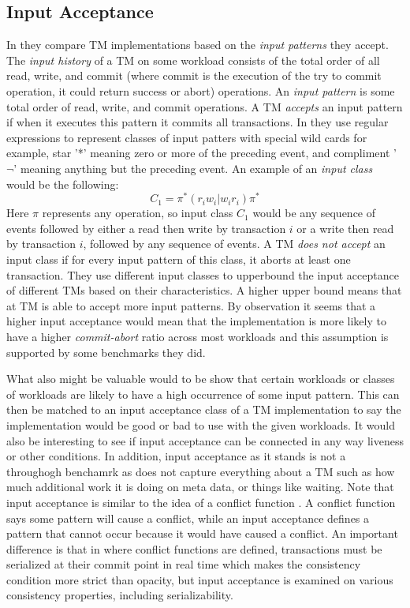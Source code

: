 \subsection{Input Acceptance}
In \cite{LPD-ARTICLE-2009-004} they compare TM implementations based on the \emph{input patterns} they accept.
The \emph{input history} of a TM on some workload consists of the total order of all read, write, and commit (where commit is the execution of the try to commit operation, it could return success or abort) operations.
An \emph{input pattern} is some total order of read, write, and commit operations.
A TM \emph{accepts} an input pattern if when it executes this pattern it commits all transactions.
In \cite{LPD-ARTICLE-2009-004} they use regular expressions to represent classes of input patters with special wild cards for example, star '*' meaning zero or more of the preceding event, and compliment '$\neg$' meaning anything but the preceding event.
An example of an \emph{input class} would be the following:
$$ C_1 = \pi{}^*(r_iw_i|w_ir_i)\pi{}^*$$
Here $\pi$ represents any operation, so input class $C_1$ would be any sequence of events followed by either a read then write by transaction $i$ or a write then read by transaction $i$, followed by any sequence of events.
A TM \emph{does not accept} an input class if for every input pattern of this class, it aborts at least one transaction.
They use different input classes to upperbound the input acceptance of different TMs based on their characteristics.
A higher upper bound means that at TM is able to accept more input patterns.
By observation it seems that a higher input acceptance would mean that the implementation is more likely to have a higher \emph{commit-abort} ratio across most workloads and this assumption is supported by some benchmarks they did.

What also might be valuable would to be show that certain workloads or classes of workloads are likely to have a high occurrence of some input pattern.
This can then be matched to an input acceptance class of a TM implementation to say the implementation would be good or bad to use with the given workloads.
It would also be interesting to see if input acceptance can be connected in any way liveness or other conditions.
In addition, input acceptance as it stands is not a throughogh benchamrk as does not capture everything about a TM such as how much additional work it is doing on meta data, or things like waiting.
Note that input acceptance is similar to the idea of a conflict function \cite{scott:semantics:transact:2006}.
A conflict function says some pattern will cause a conflict, while an input acceptance defines a pattern that cannot occur because it would have caused a conflict.
An important difference is that in \cite{scott:semantics:transact:2006} where conflict functions are defined, transactions must be serialized at their commit point in real time which makes the consistency condition more strict than opacity, but input acceptance is examined on various consistency properties, including serializability.

